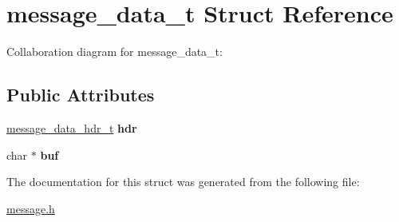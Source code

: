 \hypertarget{structmessage__data__t}{}\section{message\+\_\+data\+\_\+t Struct Reference}
\label{structmessage__data__t}


Collaboration diagram for message\+\_\+data\+\_\+t\+:
\subsection*{Public Attributes}
\begin{DoxyCompactItemize}
\item 
\mbox{\label{structmessage__data__t_a45328b402174241b93bcefcdceca4545}} 
\hyperlink{structmessage__data__hdr__t}{message\+\_\+data\+\_\+hdr\+\_\+t} {\bfseries hdr}
\item 
\mbox{\label{structmessage__data__t_aba52694fd59a6cf8227b84b3cd1c30dd}} 
char $\ast$ {\bfseries buf}
\end{DoxyCompactItemize}


The documentation for this struct was generated from the following file\+:\begin{DoxyCompactItemize}
\item 
\hyperlink{message_8h}{message.\+h}\end{DoxyCompactItemize}
